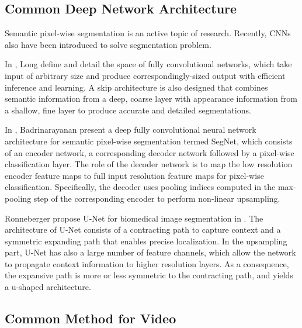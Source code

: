 \subsection{Common Deep Network Architecture}
Semantic pixel-wise segmentation is an active topic of research. Recently, CNNs also have been introduced to solve segmentation problem. 

In \cite{Long2015Fully}, Long \etal define and detail the space of fully convolutional networks, which take input of arbitrary size and produce correspondingly-sized output with efficient inference and learning. A skip architecture is also designed that combines semantic information from a deep, coarse layer with appearance information from a shallow, fine layer to produce accurate and detailed segmentations. 


In \cite{SegNet}, Badrinarayanan \etal present a deep fully convolutional neural network architecture for semantic pixel-wise segmentation termed SegNet, which consists of an encoder network, a corresponding decoder network followed by a pixel-wise classification layer. The role of the decoder network is to map the low resolution encoder feature maps to full input resolution feature maps for pixel-wise classification. Specifically, the decoder uses pooling indices computed in the max-pooling step of the corresponding encoder to perform non-linear upsampling.

Ronneberger \etal propose U-Net for biomedical image segmentation in \cite{Ronneberger2015U}. The architecture of U-Net consists of a contracting path to capture context and a symmetric expanding path that enables precise localization. 
In the upsampling part, U-Net has also a large number of feature channels, which allow the network to propagate context information to higher resolution layers. As a consequence, the expansive path is more or less symmetric to the contracting path, and yields a u-shaped architecture.

\subsection{Common Method for Video}

